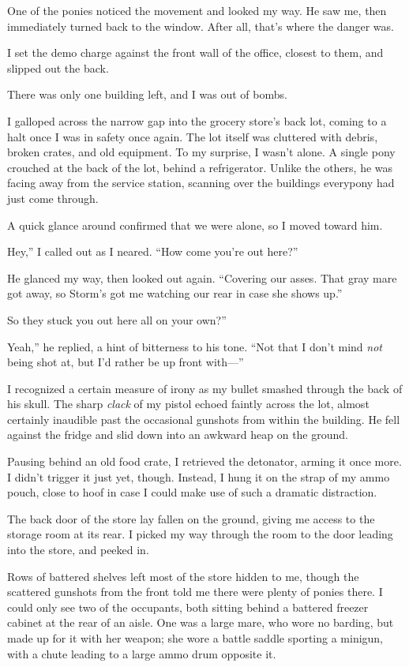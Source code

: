 One of the ponies noticed the movement and looked my way. He saw me, then immediately turned back to the window. After all, that’s where the danger was.

I set the demo charge against the front wall of the office, closest to them, and slipped out the back.

There was only one building left, and I was out of bombs.

I galloped across the narrow gap into the grocery store’s back lot, coming to a halt once I was in safety once again. The lot itself was cluttered with debris, broken crates, and old equipment. To my surprise, I wasn’t alone. A single pony crouched at the back of the lot, behind a refrigerator. Unlike the others, he was facing away from the service station, scanning over the buildings everypony had just come through.

A quick glance around confirmed that we were alone, so I moved toward him.

\leavevmode{}Hey,” I called out as I neared. “How come you’re out here?”

He glanced my way, then looked out again. “Covering our asses. That gray mare got away, so Storm’s got me watching our rear in case she shows up.”

\leavevmode{}So they stuck you out here all on your own?”

\leavevmode{}Yeah,” he replied, a hint of bitterness to his tone. “Not that I don’t mind \textit{not} being shot at, but I’d rather be up front with—”

I recognized a certain measure of irony as my bullet smashed through the back of his skull. The sharp \textit{clack} of my pistol echoed faintly across the lot, almost certainly inaudible past the occasional gunshots from within the building. He fell against the fridge and slid down into an awkward heap on the ground.

Pausing behind an old food crate, I retrieved the detonator, arming it once more. I didn’t trigger it just yet, though. Instead, I hung it on the strap of my ammo pouch, close to hoof in case I could make use of such a dramatic distraction.

The back door of the store lay fallen on the ground, giving me access to the storage room at its rear. I picked my way through the room to the door leading into the store, and peeked in.

Rows of battered shelves left most of the store hidden to me, though the scattered gunshots from the front told me there were plenty of ponies there. I could only see two of the occupants, both sitting behind a battered freezer cabinet at the rear of an aisle. One was a large mare, who wore no barding, but made up for it with her weapon; she wore a battle saddle sporting a minigun, with a chute leading to a large ammo drum opposite it.

